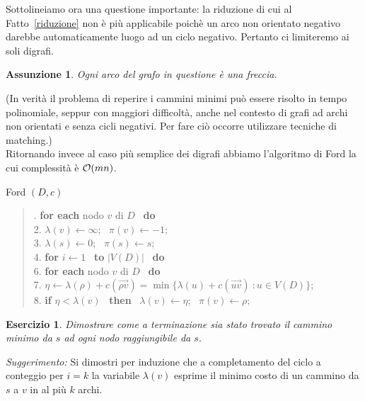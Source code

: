 \documentclass[10pt]{article}
\def\Ord{{\cal O}}
\newtheorem{Ass}[Teo]{Assunzione}
\newtheorem{Ese}[Teo]{Esercizio}
\begin{document}
Sottolineiamo ora una questione importante:
la riduzione di cui al Fatto~\ref{riduzione}
non \`e pi\`u applicabile poich\`e un arco
non orientato negativo darebbe automaticamente
luogo ad un ciclo negativo.
Pertanto ci limiteremo ai soli  digrafi.
\begin{Ass}
   Ogni arco del grafo in questione \`e una freccia.
\end{Ass}
(In verit\`a il problema di reperire i cammini minimi
pu\`o essere risolto in tempo polinomiale, seppur con maggiori
difficolt\`a,
anche nel contesto di grafi
ad archi non orientati e senza cicli negativi.
Per fare ci\`o occorre
utilizzare tecniche di matching.)\\

Ritornando invece al caso pi\`u semplice dei digrafi
abbiamo l'algoritmo di Ford la cui complessit\`a \`e $\Ord(mn)$. 

\begin{algorithm}   
\caption{{\sc Ford} $(D,c)$}
\begin{quote}
.\hspace{2mm} {\bf for each} nodo $v$ di $D$ \ {\bf do} \\
2.\hspace{8mm} $\lambda(v) \leftarrow \infty$; \ $\pi(v) \leftarrow -1$; \\
3.\hspace{2mm} $\lambda(s) \leftarrow 0$; \ $\pi(s) \leftarrow s$; \\
4.\hspace{2mm} {\bf for} $i \leftarrow 1$ \ {\bf to} $|V(D)|$ \ {\bf do}\\
6.\hspace{8mm} {\bf for each} nodo $v$ di $D$ \ {\bf do}\\
7.\hspace{16mm} $\eta \leftarrow \lambda(\rho) + c(\vec{\rho v}) = \min \{\lambda(u) + c(\vec{u v})\: : u\in V(D)\}$;\\
8.\hspace{16mm} {\bf if} $\eta < \lambda(v)$ \ {\bf then} \ $\lambda(v) \leftarrow \eta$; \ $\pi(v) \leftarrow \rho$;\\

\end{quote}
\end{algorithm}

\begin{Ese}
   Dimostrare come a terminazione sia stato
   trovato il cammino minimo da $s$ ad ogni nodo
   raggiungibile da $s$.
\end{Ese}

{\em Suggerimento:} \/ Si dimostri per induzione che
a completamento del ciclo a conteggio per $i=k$
la variabile $\lambda(v)$ esprime il minimo costo di
un cammino da $s$ a $v$ in al pi\`u $k$ archi.
\end{document}
